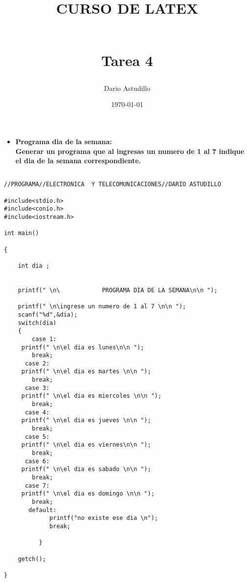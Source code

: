 \documentclass[11pt, a4paper]{article} %
\title{\begin{large}CURSO DE LATEX\end{large}\\ Tarea 4}
\author{Dario Astudillo}
\date{\today}
\begin{document}
	\maketitle
\begin{itemize}
\item\bf{Programa dia de la semana:}
\\
Generar un programa que al ingresas un numero de 1 al 7 indique el dia de la semana correspondiente.
\end{itemize}

 
\begin{lstlisting}[frame=single]

//PROGRAMA//ELECTRONICA  Y TELECOMUNICACIONES//DARIO ASTUDILLO

#include<stdio.h>
#include<conio.h>
#include<iostream.h>

int main()

{

    int dia ;


    printf(" \n\            PROGRAMA DIA DE LA SEMANA\n\n ");

    printf(" \n\ingrese un numero de 1 al 7 \n\n ");
    scanf("%d",&dia);
    switch(dia)
    {
		case 1:
	 printf(" \n\el dia es lunes\n\n ");
		break;
      case 2:
	 printf(" \n\el dia es martes \n\n ");
		break;
      case 3:
	 printf(" \n\el dia es miercoles \n\n ");
		break;
      case 4:
	 printf(" \n\el dia es jueves \n\n ");
		break;
      case 5:
	 printf(" \n\el dia es viernes\n\n ");
		break;
      case 6:
	 printf(" \n\el dia es sabado \n\n ");
		break;
      case 7:
     printf(" \n\el dia es domingo \n\n ");
		break;
       default:
             printf("no existe ese dia \n");
             break;

          }

    getch();

}
\end{lstlisting}
\end{document}

